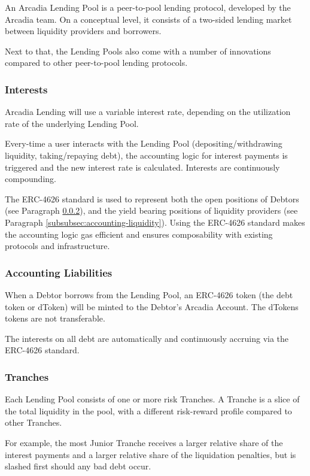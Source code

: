 \documentclass[sigconf,nonacm]{acmart}
\begin{document}
An Arcadia Lending Pool is a peer-to-pool lending protocol, developed by the Arcadia team.
On a conceptual level, it consists of a two-sided lending market between liquidity providers and borrowers.

Next to that, the Lending Pools also come with a number of innovations compared to other peer-to-pool lending protocols.

\subsubsection{Interests}
Arcadia Lending will use a variable interest rate, depending on the utilization rate of the underlying Lending Pool.

Every-time a user interacts with the Lending Pool (depositing/withdrawing liquidity, taking/repaying debt),
the accounting logic for interest payments is triggered and the new interest rate is calculated.
Interests are continuously compounding.

The ERC-4626 standard is used to represent both the open positions of Debtors (see Paragraph \ref{subsubsec:accounting-liabilities}),
and the yield bearing positions of liquidity providers (see Paragraph \ref{subsubsec:accounting-liquidity}).
Using the ERC-4626 standard makes the accounting logic gas efficient and ensures composability with existing protocols and infrastructure.

\subsubsection{Accounting Liabilities}
\label{subsubsec:accounting-liabilities}
When a Debtor borrows from the Lending Pool,
an ERC-4626 token (the debt token or dToken) will be minted to the Debtor's Arcadia Account.
The dTokens tokens are not transferable.

The interests on all debt are automatically and continuously accruing via the ERC-4626 standard.

\subsubsection{Tranches}
Each Lending Pool consists of one or more risk Tranches.
A Tranche is a slice of the total liquidity in the pool, with a different risk-reward profile compared to other Tranches.

For example, the most Junior Tranche receives a larger relative share of the interest payments and a larger relative share of the liquidation penalties,
but is slashed first should any bad debt occur.
\end{document}
